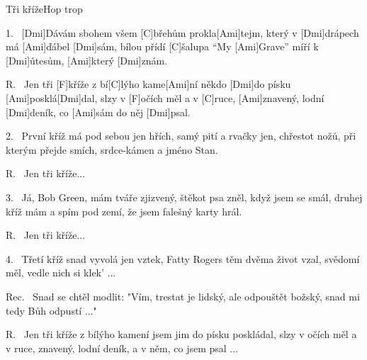\begin{song}{Tři kříže}{Hop trop}

\begin{xverse}{1.~}
[Dmi]Dávám sbohem všem [C]břehům prokla[Ami]tejm,
který v [Dmi]drápech má [Ami]{}ďábel [Dmi]sám,
bílou přídí [C]{}šalupa ``My [Ami]Grave''
míří k [Dmi]{}útesům, [Ami]který [Dmi]znám.
\end{xverse}


\begin{xverse}{R.~}
Jen tři [F]kříže z bí[C]lýho kame[Ami]ní
někdo [Dmi]do písku [Ami]posklá[Dmi]dal,
slzy v [F]očích měl a v [C]ruce, [Ami]znavený,
lodní [Dmi]deník, co [Ami]sám do něj [Dmi]psal.
\end{xverse}


\begin{xverse}{2.~}
První kříž má pod sebou jen hřích,
samý pití a rvačky jen,
chřestot nožů, při kterým přejde smích,
srdce-kámen a jméno Stan.
\end{xverse}


\begin{xverse}{R.~}
Jen tři kříže...
\end{xverse}


\begin{xverse}{3.~}
Já, Bob Green, mám tváře zjizvený,
štěkot psa zněl, když jsem se smál,
druhej kříž mám a spím pod zemí,
že jsem falešný karty hrál.
\end{xverse}


\begin{xverse}{R.~}
Jen tři kříže...
\end{xverse}


\begin{xverse}{4.~}
Třetí kříž snad vyvolá jen vztek,
Fatty Rogers těm dvěma život vzal,
svědomí měl, vedle nich si klek' ...
\end{xverse}

\begin{xverse}{Rec.~}
Snad se chtěl modlit:
"Vím, trestat je lidský,
ale odpouštět božský,
snad mi tedy Bůh odpustí ..."
\end{xverse}

\begin{xverse}{R.~}
Jen tři kříže z bílýho kamení
jsem jim do písku poskládal,
slzy v očích měl a v ruce, znavený,
lodní deník, a v něm, co jsem psal ...
\end{xverse}

\end{song}

